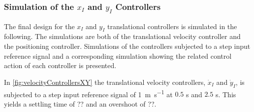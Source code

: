 \subsubsection{Simulation of the $x_I$ and $y_I$ Controllers}
The final design for the $x_I$ and $y_I$ translational controllers is simulated in the following. The simulations are both of the translational velocity controller and the positioning controller. Simulations of the controllers subjected to a step input reference signal and a corresponding simulation showing the related control action of each controller is presented. 


In \autoref{fig:velocityControllersXY} the translational velocity controllers, $\dot{x}_I$ and $\dot{y}_I$, is subjected to a step input reference signal of \SI{1}{m s^{-1}} at $0.5$ \si{s} and $2.5$ \si{s}. This yields a settling time of ?? and an overshoot of ??. 

